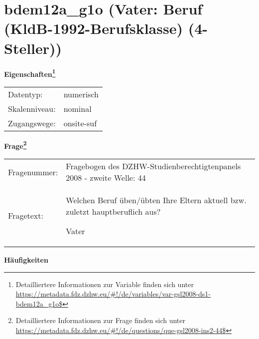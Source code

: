 
    \setcounter{footnote}{0}

    \vspace*{-1.8cm}
	\section{bdem12a\_g1o (Vater: Beruf (KldB-1992-Berufsklasse) (4-Steller))}
	\label{section:bdem12a_g1o}



    \vspace*{0.5cm}
    \noindent\textbf{Eigenschaften\footnote{Detailliertere Informationen zur Variable finden sich unter
		\url{https://metadata.fdz.dzhw.eu/\#!/de/variables/var-gsl2008-ds1-bdem12a_g1o$}}}\\
	\begin{tabularx}{\hsize}{@{}lX}
	Datentyp: & numerisch \\
	Skalenniveau: & nominal \\
	Zugangswege: &
	  onsite-suf
 \\
    \end{tabularx}



				\vspace*{0.5cm}
                \noindent\textbf{Frage\footnote{Detailliertere Informationen zur Frage finden sich unter
		              \url{https://metadata.fdz.dzhw.eu/\#!/de/questions/que-gsl2008-ins2-44$}}}\\
				\begin{tabularx}{\hsize}{@{}lX}
					Fragenummer: &
					  Fragebogen des DZHW-Studienberechtigtenpanels 2008 - zweite Welle:
					  44
 \\
					Fragetext: & Welchen Beruf üben/übten Ihre Eltern aktuell bzw. zuletzt hauptberuflich aus?\par  Vater \\
				\end{tabularx}





        		\vspace*{0.5cm}
                \noindent\textbf{Häufigkeiten}

